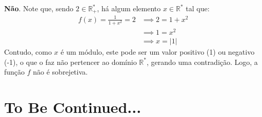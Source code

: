 \documentclass[13pt,letterpaper]{article}
\begin{document}
\begin{enumerate}
\begin{enumerate}
        \textbf{Não}. Note que, sendo $2 \in \mathbb{R}^*_+$, há algum elemento $x \in \mathbb{R}^*$ tal que:
        \begin{align*}
            f(x) = \frac{1}{1 + x^2} = 2 &\implies 2 = 1 + x^2 \\ &\implies
            1 = x^2 \\ &\implies
            x = |1|
        \end{align*}
        Contudo, como $x$ é um módulo, este pode ser um valor positivo (1) ou negativo (-1), o que o faz não pertencer ao domínio $\mathbb{R}^*$, gerando uma contradição. Logo, a função $f$ não é sobrejetiva.        
    \end{enumerate}
\end{enumerate}
\newpage
\section{To Be Continued...}
\end{document}

